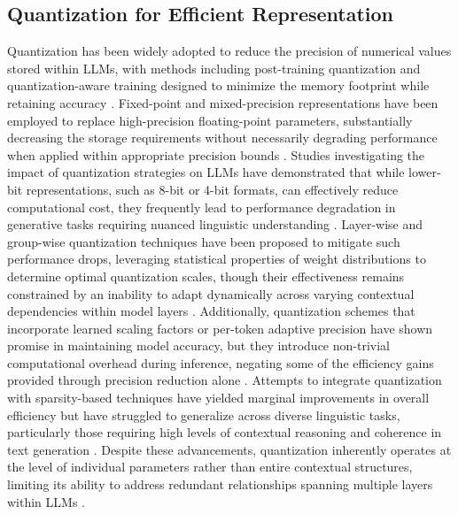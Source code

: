 \documentclass{article}
\begin{document}
\subsection{Quantization for Efficient Representation}
Quantization has been widely adopted to reduce the precision of numerical values stored within LLMs, with methods including post-training quantization and quantization-aware training designed to minimize the memory footprint while retaining accuracy \cite{korbanov2024hierarchical}. Fixed-point and mixed-precision representations have been employed to replace high-precision floating-point parameters, substantially decreasing the storage requirements without necessarily degrading performance when applied within appropriate precision bounds \cite{ tokar2024contextual}. Studies investigating the impact of quantization strategies on LLMs have demonstrated that while lower-bit representations, such as 8-bit or 4-bit formats, can effectively reduce computational cost, they frequently lead to performance degradation in generative tasks requiring nuanced linguistic understanding \cite{lodin2024dynamic}. Layer-wise and group-wise quantization techniques have been proposed to mitigate such performance drops, leveraging statistical properties of weight distributions to determine optimal quantization scales, though their effectiveness remains constrained by an inability to adapt dynamically across varying contextual dependencies within model layers \cite{tasba2024hierarchical}. Additionally, quantization schemes that incorporate learned scaling factors or per-token adaptive precision have shown promise in maintaining model accuracy, but they introduce non-trivial computational overhead during inference, negating some of the efficiency gains provided through precision reduction alone \cite{zhao2024comparative}. Attempts to integrate quantization with sparsity-based techniques have yielded marginal improvements in overall efficiency but have struggled to generalize across diverse linguistic tasks, particularly those requiring high levels of contextual reasoning and coherence in text generation \cite{ jatova2024employing}. Despite these advancements, quantization inherently operates at the level of individual parameters rather than entire contextual structures, limiting its ability to address redundant relationships spanning multiple layers within LLMs \cite{hollart2024functional}. 
\end{document}

